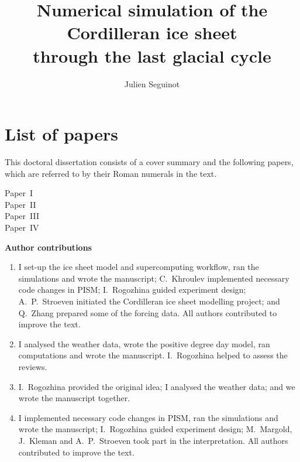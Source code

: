 \documentclass{article}
\title{Numerical simulation of the Cordilleran ice sheet \\
       through the last glacial cycle}
\author{Julien Seguinot}
\newcommand{\CCLI}[0]{Paper~I}      %
\newcommand{\PSDV}[0]{Paper~II}     %
\newcommand{\PSDP}[0]{Paper~III}    %
\newcommand{\CCYC}[0]{Paper~IV}     %
\begin{document}

\section*{List of papers}

This doctoral dissertation consists of a cover summary and the following
papers, which are referred to by their Roman numerals in the text.

\begin{description}
  \item[\CCLI] 
  \item[\PSDV] 
  \item[\PSDP] 
  \item[\CCYC] 
\end{description}

\vfill
\noindent\textbf{Author contributions}

\small{\begin{enumerate}
  \item[I] I set-up the ice sheet model and supercomputing workflow, ran the
simulations and wrote the manuscript; C.~Khroulev implemented necessary code
changes in PISM; I.~Rogozhina guided experiment design; A.~P.~Stroeven
initiated the Cordilleran ice sheet modelling project; and Q.~Zhang prepared
some of the forcing data. All authors contributed to improve the text.
  \item[II] I analysed the weather data, wrote the positive degree day model,
ran computations and wrote the manuscript. I.~Rogozhina helped to assess the
reviews.
  \item[III] I.~Rogozhina provided the original idea; I analysed the weather
data; and we wrote the manuscript together.
  \item[IV] I implemented necessary code changes in PISM, ran the simulations
and wrote the manuscript; I.~Rogozhina guided experiment design; M.~Margold,
J.~Kleman and A.~P.~Stroeven took part in the interpretation. All authors
contributed to improve the text.
\end{enumerate}}

\newpage
\maketitle
\tableofcontents
\newpage
\end{document}
